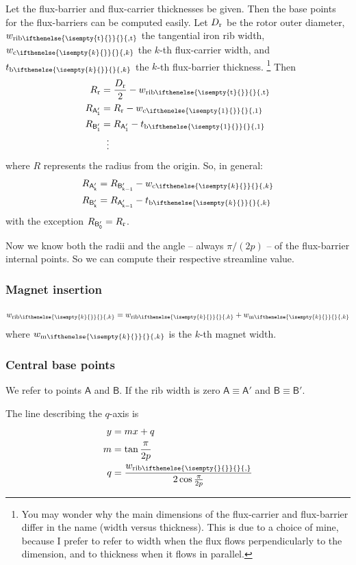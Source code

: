 \documentclass[b5paper,11pt,oneside,fleqn]{article}
\newcommand{\ped}[1]{_\textup{#1}}
\newcommand{\pt}[1]{\mathsf{#1}}
\newcommand{\wm}[1][]{%
w_{\textup{m}
\ifthenelse{\isempty{#1}{}}{}{,#1}%
}}
\newcommand{\wc}[1][]{%
w_{\textup{c}
\ifthenelse{\isempty{#1}{}}{}{,#1}%
}}
\newcommand{\tb}[1][]{%
t_{\textup{b}
\ifthenelse{\isempty{#1}{}}{}{,#1}%
}}
\newcommand{\wrib}[1][]{%
w_{\textup{rib}
\ifthenelse{\isempty{#1}{}}{}{,#1}%
}}
\newcommand{\wribt}{\wrib[\text{t}]}
\newcommand{\xth}[1]{$ #1 $-th}
\begin{document}
Let the flux-barrier and flux-carrier thicknesses be given.
Then the base points for the flux-barriers can be computed easily.
Let
$ D\ped{r} $ be the rotor outer diameter,
$ \wribt $ the tangential iron rib width,
$ \wc[k] $ the \xth{k} flux-carrier width,
and $ \tb[k] $ the \xth{k} flux-barrier thickness.%
\footnote{%
You may wonder why the main dimensions of the flux-carrier and
flux-barrier differ in the name (width versus thickness).
This is due to a choice of mine,
because I prefer to refer to width when the flux flows perpendicularly to the
dimension,
and to thickness when it flows in parallel.%
}
%
Then
\begin{equation}
\begin{aligned}
R\ped{r} &= \frac{D\ped{r}}{2} - \wribt \\
R_\pt{A_1'} &= R\ped{r} - \wc[1] \\
R_\pt{B_1'} &= R_\pt{A_1'} - \tb[1] \\
    &\:\:\,\vdots
\end{aligned}
\end{equation}
where $ R $ represents the radius from the origin.
%
So, in general:
\begin{equation}
\begin{aligned}
R_\pt{A_k'} &= R_\pt{B_{k-1}'} - \wc[k] \\
R_\pt{B_k'} &= R_\pt{A_{k-1}'} - \tb[k]
\end{aligned}
\end{equation}
with the exception $ R_\pt{B_0'} = R\ped{r} $.

Now we know both the radii and the angle -- always $ \pi/(2p) $ -- of the
flux-barrier internal points. So we can compute their respective streamline
value.



\subsubsection{Magnet insertion}
\[
\wrib[k] = \wrib[k] + \wm[k]
\]
where $ \wm[k] $ is the \xth{k} magnet width.


\subsubsection{Central base points}
We refer to points $ \pt{A} $ and $ \pt{B} $.
If the rib width is zero
$ \pt{A} \equiv \pt{A}' $ and
$ \pt{B} \equiv \pt{B}' $.

The line describing the $ q $-axis is
\begin{equation}
\begin{aligned}
y &= m x + q \\
m &= \tan\frac{\pi}{2p} \\
q &= \frac{\wrib}{2 \cos\frac{\pi}{2p}}
\end{aligned}
\end{equation}
\end{document}
